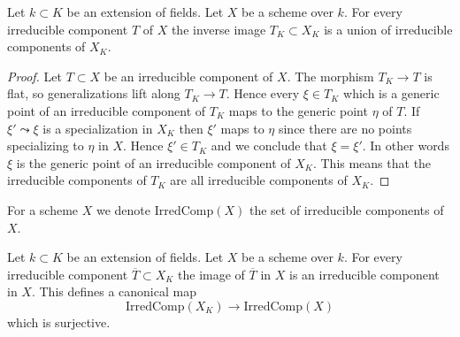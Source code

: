 \begin{lemma}
\label{lemma-inverse-image-irreducible}
Let $k \subset K$ be an extension of fields.
Let $X$ be a scheme over $k$.
For every irreducible component $T$ of $X$ the inverse image
$T_K \subset X_K$ is a union of irreducible components of $X_K$.
\end{lemma}

\begin{proof}
Let $T \subset X$ be an irreducible component of $X$.
The morphism $T_K \to T$ is flat, so generalizations lift
along $T_K \to T$. Hence every $\xi \in T_K$
which is a generic point of an irreducible component of $T_K$
maps to the generic point $\eta$ of $T$. If $\xi' \leadsto \xi$ is
a specialization in $X_K$ then $\xi'$ maps to $\eta$ since there
are no points specializing to $\eta$ in $X$. Hence $\xi' \in T_K$
and we conclude that $\xi = \xi'$. In other words $\xi$ is the
generic point of an irreducible component of $X_K$. This
means that the irreducible components of $T_K$ are all irreducible
components of $X_K$.
\end{proof}

\noindent
For a scheme $X$ we denote $\text{IrredComp}(X)$ the set of
irreducible components of $X$.

\begin{lemma}
\label{lemma-image-irreducible}
Let $k \subset K$ be an extension of fields.
Let $X$ be a scheme over $k$.
For every irreducible component $\overline{T} \subset X_K$
the image of $\overline{T}$ in $X$ is an irreducible component in $X$.
This defines a canonical map
$$
\text{IrredComp}(X_K)
\longrightarrow
\text{IrredComp}(X)
$$
which is surjective.
\end{lemma}

